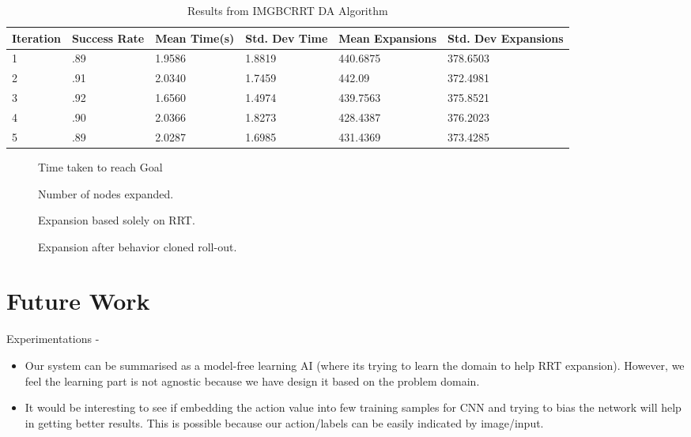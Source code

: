 \documentclass{article}
\begin{document}
\begin{table}[hbt!]
  \caption{Results from IMGBCRRT DA Algorithm}
  \label{IMGBCRRT DA Results}
  \centering
  \begin{tabular}{llllll}
    \cmidrule(r){1-6}
   Iteration & Success Rate & Mean Time(s) & Std. Dev Time & Mean Expansions & Std. Dev Expansions\\
    \midrule
    1 & .89 & 1.9586 & 1.8819 & 440.6875 & 378.6503 \\
    2 & .91 & 2.0340 & 1.7459 & 442.09 & 372.4981 \\
    3 & .92 & 1.6560 & 1.4974 & 439.7563 & 375.8521 \\
    4 & .90 & 2.0366 & 1.8273 & 428.4387 & 376.2023 \\
    5 & .89 & 2.0287 & 1.6985 & 431.4369 & 373.4285 \\
    \bottomrule
  \end{tabular}
\end{table}


\begin{figure}[h]
	\centering
\begin{minipage}{.5\textwidth}
\centering
        \caption{Time taken to reach Goal}
\end{minipage}%
\begin{minipage}{.5\textwidth}
\centering
        \caption{Number of nodes expanded.}
\end{minipage}

\end{figure}

\begin{figure}[h]
        \caption{Expansion based solely on RRT.}
\end{figure}

\begin{figure}[h]
        \caption{Expansion after behavior cloned roll-out.}
\end{figure}

\vspace{1cm}
\section{Future Work}
Experimentations - 
\begin{itemize}
  \item Our system can be summarised as a model-free learning AI (where its trying to learn the domain to help RRT expansion). However, we feel the learning part is not agnostic because we have design it based on the problem domain.
  \item It would be interesting to see if embedding the action value into few training samples for CNN and trying to bias the network will help in getting better results. This is possible because our action/labels can be easily indicated by image/input.
\end{itemize}
\end{document}
